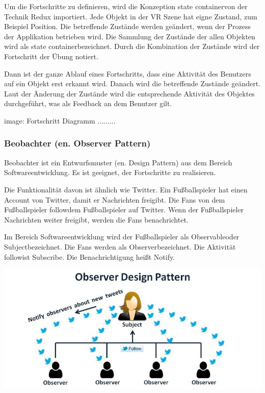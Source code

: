  Um die Fortschritte zu definieren, wird die Konzeption \glqq state container\grqq von der Technik Redux importiert. Jede Objekt in der VR Szene hat eigne Zustand, zum Beispiel Position. Die betreffende Zustände werden geändert, wenn der Prozess der Applikation betrieben wird. Die Sammlung der Zustände der allen Objekten wird als \glqq state container\grqq bezeichnet. Durch die Kombination der Zustände wird der Fortschritt der Übung notiert.
 
 Dann ist der ganze Ablauf eines Fortschritts, dass eine Aktivität des Benutzers auf ein Objekt erst erkannt wird. Danach wird die betreffende Zustände geändert. Laut der Änderung der Zustände wird die entsprechende Aktivität des Objektes durchgeführt, was als Feedback an dem Benutzer gilt.
 
 image: Fortschritt Diagramm .........
 
  \subsubsection{Beobachter (en. Observer Pattern)}
  Beobachter ist ein Entwurfsmuster (en. Design Pattern) aus dem Bereich Softwareentwicklung. Es ist geeignet, der Fortschritte zu realisieren.
  
  Die Funktionalität davon ist ähnlich wie Twitter. Ein Fußballspieler hat einen Account von Twitter, damit er Nachrichten freigibt. Die Fans von dem Fußballspieler \glqq follow\grqq dem Fußballspieler auf Twitter. Wenn der Fußballspieler Nachrichten weiter freigibt, werden die Fans benachrichtet.
  
  Im Bereich Softwareentwicklung wird der Fußballspieler als \glqq Observable\grqq oder \glqq Subject\grqq bezeichnet. Die Fans werden als \glqq Observer\grqq bezeichnet. Die Aktivität \glqq follow\grqq ist \glqq Subscribe\grqq. Die Benachrichtigung heißt \glqq Notify\grqq.
  
  \includegraphics[width=\textwidth]{images/observerPattern.jpeg}
  
